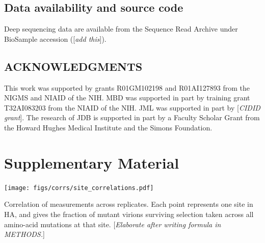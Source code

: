 \documentclass[11pt]{article}
\newcommand{\comment}[1]{{\color{red}[\textsl{#1}]}}
\begin{document}
\subsection*{Data availability and source code}
Deep sequencing data are available from the Sequence Read Archive under BioSample accession (\comment{add this}).


\clearpage

\small
\subsection*{ACKNOWLEDGMENTS}
This work was supported by grants R01GM102198 and R01AI127893 from the NIGMS and NIAID of the NIH.
MBD was supported in part by training grant T32AI083203 from the NIAID of the NIH.
JML was supported in part by \comment{CIDID grant}.
The research of JDB is supported in part by a Faculty Scholar Grant from the Howard Hughes Medical Institute and the Simons Foundation.




\clearpage
\normalsize

\section*{Supplementary Material}
\FloatBarrier

\begin{suppfigure}
\centerline{\texttt{[image: figs/corrs/site\_correlations.pdf]}}
\caption{\label{suppfig:corr}
Correlation of measurements across replicates. 
Each point represents one site in HA, and gives the fraction of mutant virions surviving selection taken across all amino-acid mutations at that site.
\comment{Elaborate after writing formula in METHODS.}
}
\end{suppfigure}
\end{document}
